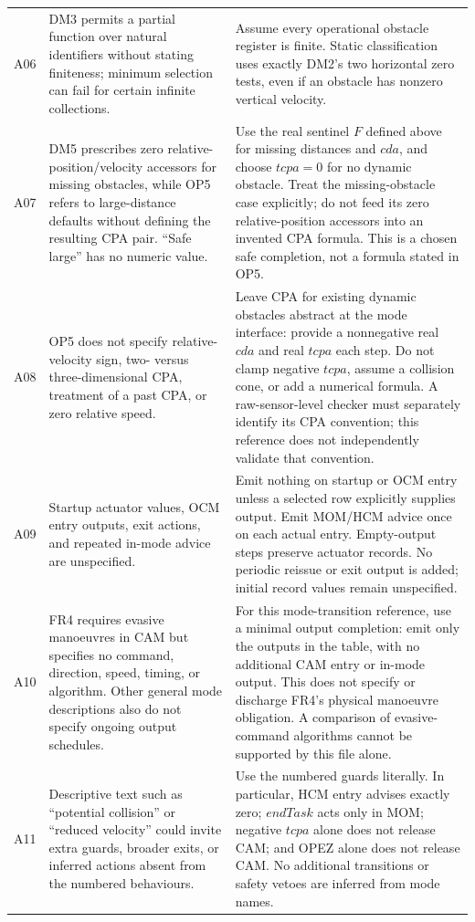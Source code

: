 \documentclass[10pt,a4paper]{article}
\begin{document}
\begin{longtable}{@{}L{0.07\textwidth}L{0.40\textwidth}L{0.45\textwidth}@{}}
A06 & DM3 permits a partial function over natural identifiers without stating finiteness; minimum selection can fail for certain infinite collections. & Assume every operational obstacle register is finite. Static classification uses exactly DM2's two horizontal zero tests, even if an obstacle has nonzero vertical velocity. \\
A07 & DM5 prescribes zero relative-position/velocity accessors for missing obstacles, while OP5 refers to large-distance defaults without defining the resulting CPA pair. ``Safe large'' has no numeric value. & Use the real sentinel $\mathit{F}$ defined above for missing distances and $\mathit{cda}$, and choose $\mathit{tcpa} = 0$ for no dynamic obstacle. Treat the missing-obstacle case explicitly; do not feed its zero relative-position accessors into an invented CPA formula. This is a chosen safe completion, not a formula stated in OP5. \\
A08 & OP5 does not specify relative-velocity sign, two- versus three-dimensional CPA, treatment of a past CPA, or zero relative speed. & Leave CPA for existing dynamic obstacles abstract at the mode interface: provide a nonnegative real $\mathit{cda}$ and real $\mathit{tcpa}$ each step. Do not clamp negative $\mathit{tcpa}$, assume a collision cone, or add a numerical formula. A raw-sensor-level checker must separately identify its CPA convention; this reference does not independently validate that convention. \\
A09 & Startup actuator values, OCM entry outputs, exit actions, and repeated in-mode advice are unspecified. & Emit nothing on startup or OCM entry unless a selected row explicitly supplies output. Emit MOM/HCM advice once on each actual entry. Empty-output steps preserve actuator records. No periodic reissue or exit output is added; initial record values remain unspecified. \\
A10 & FR4 requires evasive manoeuvres in CAM but specifies no command, direction, speed, timing, or algorithm. Other general mode descriptions also do not specify ongoing output schedules. & For this mode-transition reference, use a minimal output completion: emit only the outputs in the table, with no additional CAM entry or in-mode output. This does not specify or discharge FR4's physical manoeuvre obligation. A comparison of evasive-command algorithms cannot be supported by this file alone. \\
A11 & Descriptive text such as ``potential collision'' or ``reduced velocity'' could invite extra guards, broader exits, or inferred actions absent from the numbered behaviours. & Use the numbered guards literally. In particular, HCM entry advises exactly zero; $\mathit{endTask}$ acts only in MOM; negative $\mathit{tcpa}$ alone does not release CAM; and OPEZ alone does not release CAM. No additional transitions or safety vetoes are inferred from mode names. \\

\end{longtable}
\end{document}
